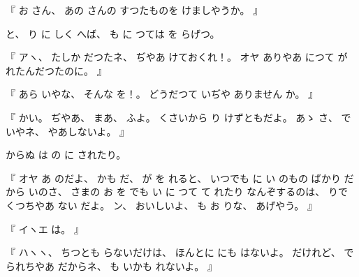 %
『
お
さん、
%
あの
さんの
すつたものを
けましやうか。
』

%
と、
%
り
に
しく
へば、
%
も
に
つては
を
らげつ。

%
『
アヽ、
%
たしか
だつたネ、
%
ぢやあ
けておくれ！。
%
オヤ
ありやあ
につて
が
れたんだつたのに。
』

%
『
あら
いやな、
%
そんな
を！。
%
どうだつて
いぢや
ありません
%
か。
』

%
『
かい。
%
ぢやあ、
%
まあ、
%
ふよ。
%
くさいから
り
けずともだよ。
%
あゝ
さ、
%
で
いやネ、
%
やあしないよ。
』

%
からぬ
は
の
に
されたり。

%
『
オヤ
あ
のだよ、
かも
だ、
%
が
を
れると、
%
いつでも
に
い
のもの
ばかり
だから
いのさ、
%
さまの
お
を
でも
い
に
つて
て
れたり
なんぞするのは、
%
りで
くつちやあ
ない
だよ。
%
ン、
%
おいしいよ、
%
も
お
りな、
%
あげやう。
』

%
『
イヽエ
は。
』

%
『
ハヽヽ、
%
ちつとも
らないだけは、
%
ほんとに
にも
はないよ。
%
だけれど、
%
で
られちやあ
だからネ、
%
も
いかも
れないよ。
』

